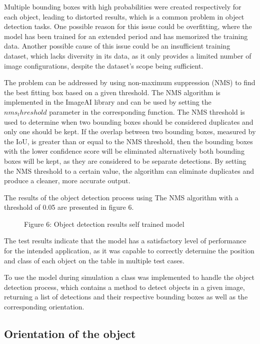 Multiple bounding boxes with high probabilities were created respectively for each object, leading to distorted results, which is a common problem in object detection tasks. One possible reason for this issue could be overfitting, where the model has been trained for an extended period and has memorized the training data. Another possible cause of this issue could be an insufficient training dataset, which lacks diversity in its data, as it only provides a limited number of image configurations, despite the dataset's scope being sufficient.

The problem can be addressed by using non-maximum suppression (NMS) to find the best fitting box based on a given threshold. The NMS algorithm is implemented in the ImageAI library and can be used by setting the \(nms_threshold\) parameter in the corresponding function. The NMS threshold is used to determine when two bounding boxes should be considered duplicates and only one should be kept. If the overlap between two bounding boxes, measured by the IoU, is greater than or equal to the NMS threshold, then  the bounding boxes with the lower confidence score will be eliminated alternatively both bounding boxes will be kept, as they are considered to be separate detections. By setting the NMS threshold to a certain value, the algorithm can eliminate duplicates and produce a cleaner, more accurate output. 

The results of the object detection process using The NMS algorithm with a threshold of 0.05 are presented in figure 6.

\begin{figure}[!htbp]
    \centering
    \caption{Figure 6: Object detection results self trained model }
\end{figure}

The test results indicate that the model has a satisfactory level of performance for the intended application, as it was capable to correctly determine the position and class of each object on the table in multiple test cases. 

To use the model during simulation a class was implemented to handle the object detection process, which contains a method to detect objects in a given image, returning a list of detections and their respective bounding boxes as well as the corresponding orientation.

\subsection{Orientation of the object}


